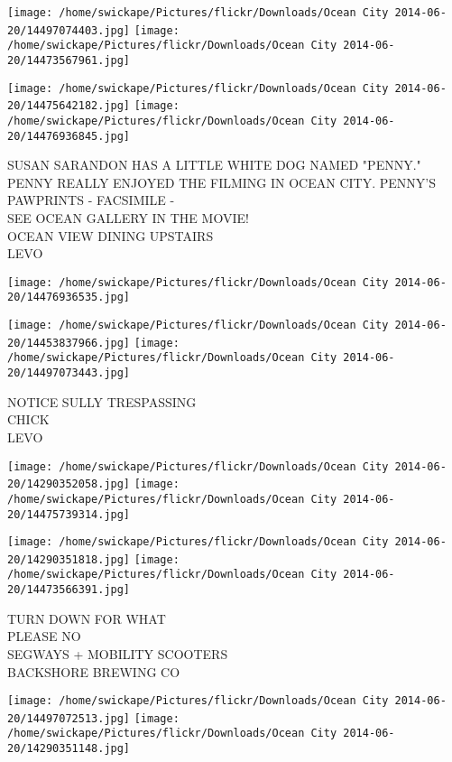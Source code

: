 \documentclass[10pt,letterpaper]{article}
\begin{document}
\texttt{[image: /home/swickape/Pictures/flickr/Downloads/Ocean City 2014-06-20/14497074403.jpg]}
\texttt{[image: /home/swickape/Pictures/flickr/Downloads/Ocean City 2014-06-20/14473567961.jpg]}

\texttt{[image: /home/swickape/Pictures/flickr/Downloads/Ocean City 2014-06-20/14475642182.jpg]}
\texttt{[image: /home/swickape/Pictures/flickr/Downloads/Ocean City 2014-06-20/14476936845.jpg]}

SUSAN SARANDON HAS A LITTLE WHITE DOG NAMED "PENNY."  PENNY REALLY ENJOYED THE FILMING IN OCEAN CITY.  PENNY'S PAWPRINTS {-} FACSIMILE {-}\\
SEE OCEAN GALLERY IN THE MOVIE!\\
OCEAN VIEW DINING UPSTAIRS\\
LEVO
\pagebreak

\texttt{[image: /home/swickape/Pictures/flickr/Downloads/Ocean City 2014-06-20/14476936535.jpg]}

\vspace{0.25in}
\texttt{[image: /home/swickape/Pictures/flickr/Downloads/Ocean City 2014-06-20/14453837966.jpg]}
\texttt{[image: /home/swickape/Pictures/flickr/Downloads/Ocean City 2014-06-20/14497073443.jpg]}

NOTICE SULLY TRESPASSING\\
CHICK\\
LEVO
\pagebreak

\texttt{[image: /home/swickape/Pictures/flickr/Downloads/Ocean City 2014-06-20/14290352058.jpg]}
\texttt{[image: /home/swickape/Pictures/flickr/Downloads/Ocean City 2014-06-20/14475739314.jpg]}

\texttt{[image: /home/swickape/Pictures/flickr/Downloads/Ocean City 2014-06-20/14290351818.jpg]}
\texttt{[image: /home/swickape/Pictures/flickr/Downloads/Ocean City 2014-06-20/14473566391.jpg]}

TURN DOWN FOR WHAT\\
PLEASE NO\\
SEGWAYS + MOBILITY SCOOTERS\\
BACKSHORE BREWING CO
\pagebreak

\texttt{[image: /home/swickape/Pictures/flickr/Downloads/Ocean City 2014-06-20/14497072513.jpg]}
\texttt{[image: /home/swickape/Pictures/flickr/Downloads/Ocean City 2014-06-20/14290351148.jpg]}
\end{document}

